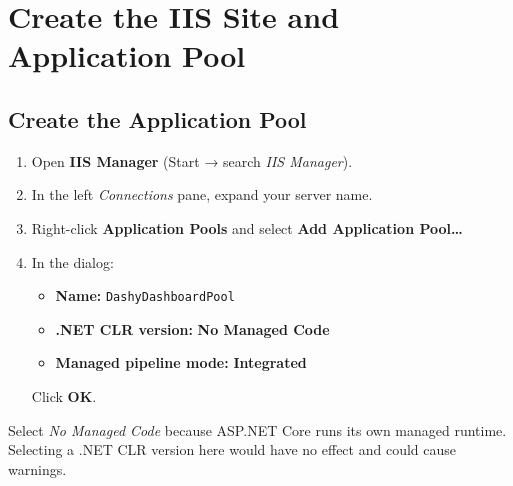 \documentclass[12pt,a4paper]{report}
\begin{document}
\chapter{Create the IIS Site and Application Pool}
\label{ch:site}

\section{Create the Application Pool}
\begin{enumerate}
  \item Open \textbf{IIS Manager} (Start → search \emph{IIS Manager}).

  \item In the left \emph{Connections} pane, expand your server name.

  \item Right-click \textbf{Application Pools} and select \textbf{Add Application Pool\ldots}

  \item In the dialog:
  \begin{itemize}
    \item \textbf{Name:} \texttt{DashyDashboardPool}
    \item \textbf{.NET CLR version:} \textbf{No Managed Code}
    \item \textbf{Managed pipeline mode:} \textbf{Integrated}
  \end{itemize}
  Click \textbf{OK}.
\end{enumerate}

\begin{notebox}
Select \emph{No Managed Code} because ASP.NET Core runs its own managed runtime. Selecting a .NET CLR version here would have no effect and could cause warnings.
\end{notebox}
\end{document}
